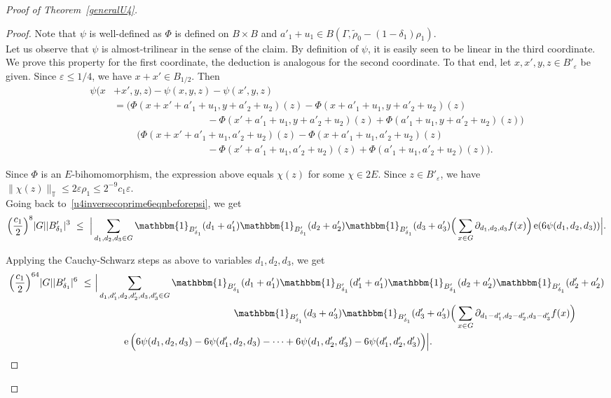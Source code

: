 \documentclass[a4paper,11pt]{article}
\numberwithin{theorem}{section}
\theoremstyle{definition}
\newcommand\id{\mathbbm{1}}
\newcommand{\on}[1]{
	\operatorname{#1}
}
\begin{document}
\begin{proof}[Proof of Theorem~\ref{generalU4}]
\begin{proof}
        Note that $\psi$ is well-defined as $\Phi$ is defined on $B \times B$ and $a'_1 + u_1 \in B(\Gamma, \tilde{\rho}_0 - (1 - \delta_1)\rho_1)$.\\
         \indent Let us observe that $\psi$ is almost-trilinear in the sense of the claim. By definition of $\psi$, it is easily seen to be linear in the third coordinate. We prove this property for the first coordinate, the deduction is analogous for the second coordinate. To that end, let $x, x',y, z\in B'_{\varepsilon}$ be given. Since $\varepsilon \leq 1/4$, we have $x + x' \in B_{1/2}$. Then
         \begin{align*}\psi(x& + x', y, z) - \psi(x, y, z) - \psi(x', y, z) \\
         &= \Big(\Phi(x + x' + a'_1 + u_1, y + a'_2 + u_2)(z) - \Phi(x + a'_1 + u_1, y + a'_2 + u_2)(z) \\
         &\hspace{4cm}- \Phi(x' + a'_1 + u_1, y + a'_2 + u_2)(z) + \Phi(a'_1 + u_1, y + a'_2 + u_2)(z)\Big)\\
         &\hspace{1cm}\Big(\Phi(x + x' + a'_1 + u_1, a'_2 + u_2)(z) - \Phi(x + a'_1 + u_1, a'_2 + u_2)(z) \\
         &\hspace{4cm}- \Phi(x' + a'_1 + u_1, a'_2 + u_2)(z) + \Phi(a'_1 + u_1, a'_2 + u_2)(z)\Big).\end{align*}

        Since $\Phi$ is an $E$-bihomomorphism, the expression above equals $\chi(z)$ for some $\chi \in 2E$. Since $z \in B'_\varepsilon$, we have $\|\chi(z)\|_{\mathbb{T}} \leq 2 \varepsilon \rho_1 \leq 2^{-9}c_1\varepsilon$.\\

        Going back to~\eqref{u4inversecoprime6eqnbeforepsi}, we get
         \[\Big(\frac{c_1}{2}\Big)^8 |G| |B'_{\delta_1}|^3 \,\,\leq\,\, \Big|\sum_{d_1, d_2, d_3 \in  G}\id_{B'_{\delta_1}}(d_1 + a'_1) \id_{B'_{\delta_1}}(d_2 + a'_2)\id_{B'_{\delta_1}}(d_3 + a'_3)\Big(\sum_{x \in G} \partial_{d_1, d_2, d_3} f(x)\Big) \on{e}(6\psi(d_1, d_2, d_3))\Big|.\]

         Applying the Cauchy-Schwarz steps as above to variables $d_1, d_2, d_3$, we get
         \begin{align*}\Big(\frac{c_1}{2}\Big)^{64} |G| |B'_{\delta_1}|^6 \,\,\leq\,\, &\Big|\sum_{d_1,d_1', d_2,d_2', d_3,d_3' \in  G} \id_{B'_{\delta_1}}(d_1 + a'_1)\id_{B'_{\delta_1}}(d'_1 + a'_1) \id_{B'_{\delta_1}}(d_2 + a'_2)\id_{B'_{\delta_1}}(d'_2 + a'_2)\\
         &\hspace{5cm}\id_{B'_{\delta_1}}(d_3 + a'_3)\id_{B'_{\delta_1}}(d'_3 + a'_3)\Big(\sum_{x \in G} \partial_{d_1 - d_1', d_2 - d_2', d_3 - d_3'} f(x)\Big)\\
         &\hspace{1cm} \on{e}\Big(6\psi(d_1, d_2, d_3) - 6\psi(d'_1, d_2, d_3) - \dots + 6\psi(d_1, d'_2, d'_3) - 6\psi(d'_1, d'_2, d'_3)\Big)\Big|.\end{align*}


\end{proof}
\end{proof}
\end{document}
